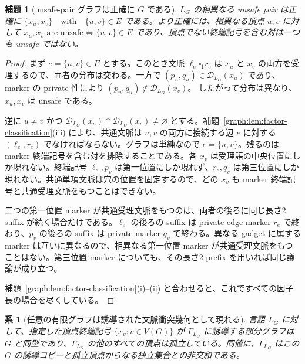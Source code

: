 \documentclass[10pt,a4paper]{ltjsarticle}
\newtheorem{lemma}[theorem]{補題}
\newtheorem{corollary}[theorem]{系}
\theoremstyle{definition}
\theoremstyle{remark}
\newcommand{\D}{\mathcal D}
\newcommand{\blank}{\square}
\begin{document}
\begin{lemma}[unsafe-pair グラフは正確に \(G\) である]
\label{graph:lem:unsafe-exact}
\(L_G\) の相異なる unsafe pair は正確に
\(\{x_u,x_v\} \quad\text{with}\quad \{u,v\}\in E\)
である。より正確には、相異なる頂点 \(u,v\) に対して
\(x_u,x_v\text{ are unsafe} \iff \{u,v\}\in E\)
であり、頂点でない終端記号を含む対は一つも unsafe ではない。
\end{lemma}

\begin{proof}
まず \(e=\{u,v\}\in E\) とする。このとき文脈
\(\ell_e\blank_1r_e\)
は $x_u$ と $x_v$ の両方を受理するので、両者の分布は交わる。一方で
\((p_u,q_u)\in\D_{L_G}(x_u)\)
であり、marker の private 性により
\((p_u,q_u)\notin\D_{L_G}(x_v)\)。
したがって分布は異なり、$x_u,x_v$ は unsafe である。

逆に $u\neq v$ かつ
\(\D_{L_G}(x_u)\cap\D_{L_G}(x_v)\neq\varnothing\)
とする。補題~\ref{graph:lem:factor-classification}\textup{(iii)} により、共通文脈は $u,v$ の両方に接続する辺 $e$ に対する
$(\ell_e,r_e)$
でなければならない。グラフは単純なので $e=\{u,v\}$。残るのは marker 終端記号を含む対を排除することである。各 $x_v$ は受理語の中央位置にしか現れない。終端記号 $\ell_e,p_v$ は第一位置にしか現れず、$r_e,q_v$ は第三位置にしか現れない。共通単項文脈は穴の位置を固定するので、どの $x_v$ も marker 終端記号と共通受理文脈をもつことはできない。

二つの第一位置 marker が共通受理文脈をもつのは、両者の後ろに同じ長さ2 suffix が続く場合だけである。$\ell_e$ の後ろの suffix は private edge marker $r_e$ で終わり、$p_v$ の後ろの suffix は private marker $q_v$ で終わる。異なる gadget に属する marker は互いに異なるので、相異なる第一位置 marker が共通受理文脈をもつことはない。第三位置 marker についても、その長さ2 prefix を用いれば同じ議論が成り立つ。

補題~\ref{graph:lem:factor-classification}\textup{(i)--(ii)} と合わせると、これですべての因子長の場合を尽くしている。
\end{proof}

\begin{corollary}[任意の有限グラフは誘導された文脈衝突幾何として現れる]
\label{graph:cor:conflict-realization}
言語 \(L_G\) に対して、指定した頂点終端記号
\(\{x_v:v\in V(G)\}\)
が \(\Gamma_{L_G}\) に誘導する部分グラフは \(G\) と同型であり、\(\Gamma_{L_G}\) の他のすべての頂点は孤立している。同値に、\(\Gamma_{L_G}\) はこの $G$ の誘導コピーと孤立頂点からなる独立集合との非交和である。
\end{corollary}
\end{document}

